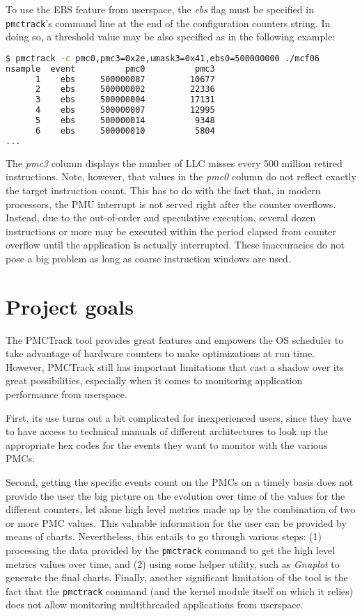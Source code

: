To use the EBS feature from userspace, the \textit{ebs} flag must be
specified in \texttt{pmctrack}'s command line at the end of the
configuration counters string. In doing so, a threshold value may be
also specified as in the following example:

\begin{lstlisting}[language=bash,basicstyle=\tt\scriptsize]
$ pmctrack -c pmc0,pmc3=0x2e,umask3=0x41,ebs0=500000000 ./mcf06
nsample  event          pmc0          pmc3
      1    ebs     500000087         10677
      2    ebs     500000002         22336
      3    ebs     500000004         17131
      4    ebs     500000007         12995
      5    ebs     500000014          9348
      6    ebs     500000010          5804
...
\end{lstlisting}

The \textit{pmc3} column displays the number of LLC misses every 500
million retired instructions. Note, however, that values in the
\textit{pmc0} column do not reflect exactly the target instruction
count. This has to do with the fact that, in modern processors, the PMU
interrupt is not served right after the counter overflows. Instead, due
to the out-of-order and speculative execution, several dozen
instructions or more may be executed within the period elapsed from
counter overflow until the application is actually interrupted. These
inaccuracies do not pose a big problem as long as coarse instruction
windows are used.

\section{Project goals}\label{project-goals}

The PMCTrack tool provides great features and empowers the OS scheduler
to take advantage of hardware counters to make optimizations at
run time. However, PMCTrack still has important limitations that cast a
shadow over its great possibilities, especially when it comes to monitoring application performance from userspace.

First, its use turns out a bit complicated for inexperienced
users, since they have to have access to technical manuals of different
architectures to look up the appropriate hex codes for the events they want to monitor with the various PMCs.

Second, getting the specific events count on the PMCs on a timely basis does not provide the user the big picture on the evolution over time of the values for the different counters, let alone high level metrics made up by the
combination of two or more PMC values. This valuable information for the
user can be provided by means of charts. Nevertheless, this entails to go through various steps: (1) processing the data provided by the \texttt{pmctrack} command to
get the high level metrics values over time, and (2) using some helper utility, such as \emph{Gnuplot} to generate the final charts. Finally, another significant limitation of the tool is the fact that the \texttt{pmctrack} command (and the kernel module itself on which it relies) does not allow monitoring multithreaded applications from userspace.

